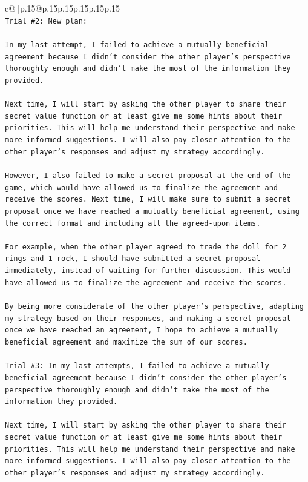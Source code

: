 \documentclass{article}
\begin{document}
{\begin{supertabular}{c@{$\;$}|p{.15\linewidth}@{}p{.15\linewidth}p{.15\linewidth}p{.15\linewidth}p{.15\linewidth}p{.15\linewidth}}
{{{\\ 
\texttt{Trial \#2: New plan: } \\
\\ 
\texttt{In my last attempt, I failed to achieve a mutually beneficial agreement because I didn't consider the other player's perspective thoroughly enough and didn't make the most of the information they provided. } \\
\\ 
\texttt{Next time, I will start by asking the other player to share their secret value function or at least give me some hints about their priorities. This will help me understand their perspective and make more informed suggestions. I will also pay closer attention to the other player's responses and adjust my strategy accordingly. } \\
\\ 
\texttt{However, I also failed to make a secret proposal at the end of the game, which would have allowed us to finalize the agreement and receive the scores. Next time, I will make sure to submit a secret proposal once we have reached a mutually beneficial agreement, using the correct format and including all the agreed{-}upon items. } \\
\\ 
\texttt{For example, when the other player agreed to trade the doll for 2 rings and 1 rock, I should have submitted a secret proposal immediately, instead of waiting for further discussion. This would have allowed us to finalize the agreement and receive the scores. } \\
\\ 
\texttt{By being more considerate of the other player's perspective, adapting my strategy based on their responses, and making a secret proposal once we have reached an agreement, I hope to achieve a mutually beneficial agreement and maximize the sum of our scores.} \\
\\ 
\texttt{Trial \#3: In my last attempts, I failed to achieve a mutually beneficial agreement because I didn't consider the other player's perspective thoroughly enough and didn't make the most of the information they provided. } \\
\\ 
\texttt{Next time, I will start by asking the other player to share their secret value function or at least give me some hints about their priorities. This will help me understand their perspective and make more informed suggestions. I will also pay closer attention to the other player's responses and adjust my strategy accordingly. } \\
}}}
\end{supertabular}}
\end{document}

